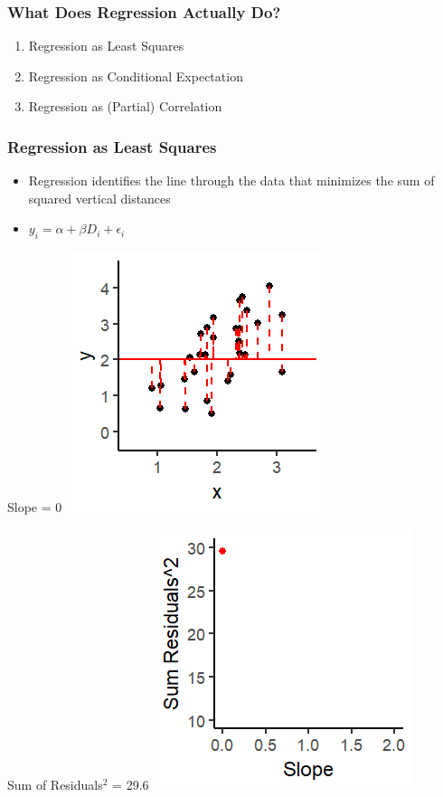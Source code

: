 \documentclass[xcolor=x11names,compress]{beamer}\usepackage[]{graphicx}\usepackage[]{color}
\makeatletter
\def\maxwidth{ %
  \ifdim\Gin@nat@width>\linewidth
    \linewidth
  \else
    \Gin@nat@width
  \fi
}
\newenvironment{knitrout}{}{} %
\renewcommand{\(}{\begin{columns}}
\renewcommand{\)}{\end{columns}}
\newcommand{\<}[1]{\begin{column}{#1}}
\renewcommand{\>}{\end{column}}
\makeatother
\begin{document}
\begin{frame}
\frametitle{What Does Regression Actually Do?}
\begin{enumerate}
\item Regression as Least Squares
\item Regression as Conditional Expectation
\item Regression as (Partial) Correlation
\end{enumerate}
\end{frame}


\begin{frame}
\frametitle{Regression as Least Squares}
\begin{itemize}
\item Regression identifies the line through the data that minimizes the sum of squared vertical distances 
\pause
\item $y_i = \alpha + \beta D_i + \epsilon_i$
\pause
\end{itemize}
\begin{multicols}{2}
Slope = 0
\begin{knitrout}
\color{fgcolor}
\includegraphics[width=\maxwidth]{figure/graph_ols1-1} 

\end{knitrout}
\columnbreak
Sum of Residuals$^2$ = 29.6
\begin{knitrout}
\color{fgcolor}
\includegraphics[width=\maxwidth]{figure/graph_ssr1-1} 

\end{knitrout}
\end{multicols}
\end{frame}
\end{document}
